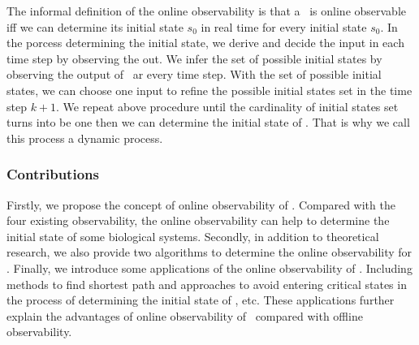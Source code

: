 The informal definition of the online observability is that  a \BCN\ is online observable iff we can determine its initial state $s_0$ in real time for every initial state $s_0$. In the porcess determining the initial state, we derive and decide the input in each time step by observing the out. We infer the set of possible initial states by observing the output of \BCN\ ar every time step. With the set of possible initial states, we can choose one input to refine the possible initial states set in the time step $k+1$. We repeat above procedure until the cardinality of initial states set turns into be one then we can determine the initial state of \BCNs. That is why we call this process a dynamic process. 

\subsubsection*{Contributions}
Firstly, we propose the concept of online observability of \BCNs. Compared with the four existing observability, the online observability can help to determine the initial state of some biological systems. Secondly, in addition to theoretical research, we also provide two algorithms to determine the online observability for \BCNs. Finally, we introduce some applications of the online observability of \BCNs. Including methods to find shortest path and approaches to avoid entering critical states in the process of determining the initial state of \BCNs, etc.  These applications further explain the advantages of online observability of \BCNs\ compared with offline observability. %
